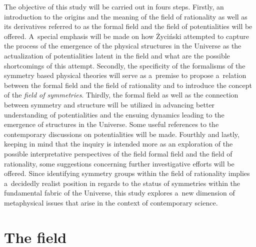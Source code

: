 The objective of this study will be carried out in fours steps. Firstly, an introduction to the origins and the meaning of the field of rationality as well as its derivatives referred to as the formal field and the field of potentialities will be offered. A~special emphasis will be made on how Życiński attempted to capture the process of the emergence of the physical structures in the Universe as the actualization of potentialities latent in the field and what are the possible shortcomings of this attempt. Secondly, the specificity of the formalisms of the symmetry based physical theories will serve as a~premise to propose a~relation between the formal field and the field of rationality and to introduce the concept of the \textit{field of symmetries}. Thirdly, the formal field as well as the connection between symmetry and structure will be utilized in advancing better understanding of potentialities and the ensuing dynamics leading to the emergence of structures in the Universe. Some useful references to the contemporary discussions on potentialities will be made. Fourthly and lastly, keeping in mind that the inquiry is intended more as an exploration of the possible interpretative perspectives of the field formal field and the field of rationality, some suggestions concerning further investigative efforts will be offered. Since identifying symmetry groups within the field of rationality implies a~decidedly realist position in regards to the status of symmetries within the fundamental fabric of the Universe, this study explores a~new dimension of metaphysical issues that arise in the context of contemporary science.



\section{The field}

